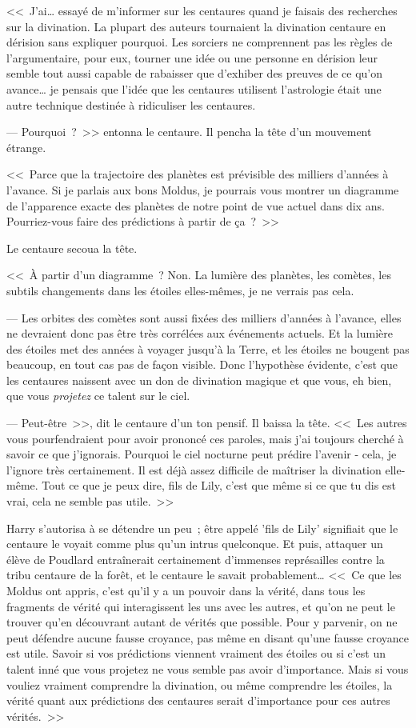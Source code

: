 <<~J'ai… essayé de m'informer sur les centaures quand je faisais des recherches sur la divination. La plupart des auteurs tournaient la divination centaure en dérision sans expliquer pourquoi. Les sorciers ne comprennent pas les règles de l'argumentaire, pour eux, tourner une idée ou une personne en dérision leur semble tout aussi capable de rabaisser que d'exhiber des preuves de ce qu'on avance… je pensais que l'idée que les centaures utilisent l'astrologie était une autre technique destinée à ridiculiser les centaures.

--- Pourquoi~?~>> entonna le centaure. Il pencha la tête d'un mouvement étrange.

<<~Parce que la trajectoire des planètes est prévisible des milliers d'années à l'avance. Si je parlais aux bons Moldus, je pourrais vous montrer un diagramme de l'apparence exacte des planètes de notre point de vue actuel dans dix ans. Pourriez-vous faire des prédictions à partir de ça~?~>>

Le centaure secoua la tête.

<<~À partir d'un diagramme~? Non. La lumière des planètes, les comètes, les subtils changements dans les étoiles elles-mêmes, je ne verrais pas cela.

--- Les orbites des comètes sont aussi fixées des milliers d'années à l'avance, elles ne devraient donc pas être très corrélées aux événements actuels. Et la lumière des étoiles met des années à voyager jusqu'à la Terre, et les étoiles ne bougent pas beaucoup, en tout cas pas de façon visible. Donc l'hypothèse évidente, c'est que les centaures naissent avec un don de divination magique et que vous, eh bien, que vous \emph{projetez} ce talent sur le ciel.

--- Peut-être~>>, dit le centaure d'un ton pensif. Il baissa la tête. <<~Les autres vous pourfendraient pour avoir prononcé ces paroles, mais j'ai toujours cherché à savoir ce que j'ignorais. Pourquoi le ciel nocturne peut prédire l'avenir - cela, je l'ignore très certainement. Il est déjà assez difficile de maîtriser la divination elle-même. Tout ce que je peux dire, fils de Lily, c'est que même si ce que tu dis est vrai, cela ne semble pas utile.~>>

Harry s'autorisa à se détendre un peu~; être appelé 'fils de Lily' signifiait que le centaure le voyait comme plus qu'un intrus quelconque. Et puis, attaquer un élève de Poudlard entraînerait certainement d'immenses représailles contre la tribu centaure de la forêt, et le centaure le savait probablement… <<~Ce que les Moldus ont appris, c'est qu'il y a un pouvoir dans la vérité, dans tous les fragments de vérité qui interagissent les uns avec les autres, et qu'on ne peut le trouver qu'en découvrant autant de vérités que possible. Pour y parvenir, on ne peut défendre aucune fausse croyance, pas même en disant qu'une fausse croyance est utile. Savoir si vos prédictions viennent vraiment des étoiles ou si c'est un talent inné que vous projetez ne vous semble pas avoir d'importance. Mais si vous vouliez vraiment comprendre la divination, ou même comprendre les étoiles, la vérité quant aux prédictions des centaures serait d'importance pour ces autres vérités.~>>

